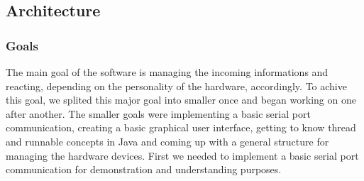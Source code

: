\subsection{Architecture}
\subsubsection{Goals}

The main goal of the software is managing the incoming informations and reacting, depending on the personality of the hardware, accordingly. To achive this goal, we splited this major goal into smaller once and began working on one after another. The smaller goals were implementing a basic serial port communication, creating a basic graphical user interface, getting to know thread and runnable concepts in Java and coming up with a general structure for managing the hardware devices.
First we needed to implement a basic serial port communication for demonstration and understanding purposes.


